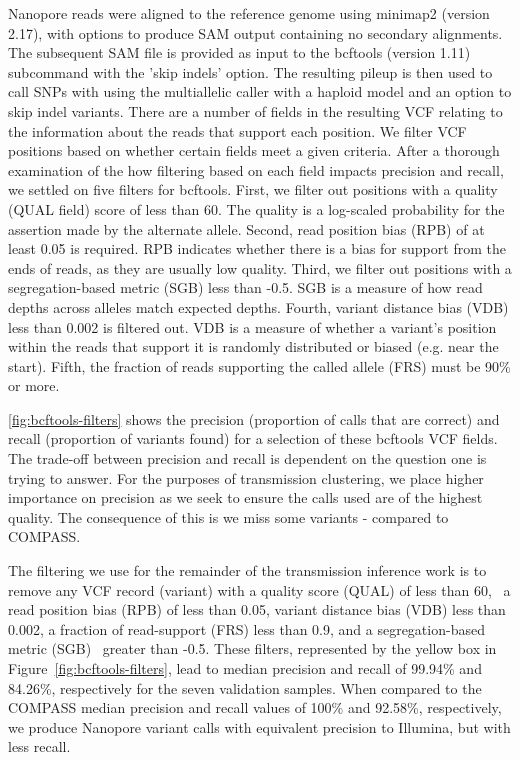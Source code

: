Nanopore reads were aligned to the \mtb{} reference genome using minimap2 (version 2.17), with options to produce SAM output containing no secondary alignments. The subsequent SAM file is provided as input to the bcftools (version 1.11) subcommand  with the 'skip indels' option. The resulting pileup is then used to call SNPs with  using the multiallelic caller with a haploid model and an option to skip indel variants.
There are a number of fields in the resulting VCF relating to the information about the reads that support each position. We filter VCF positions based on whether certain fields meet a given criteria.
After a thorough examination of the how filtering based on each field impacts precision and recall, we settled on five filters for bcftools. First, we filter out positions with a quality (QUAL field) score of less than 60. The quality is a log-scaled probability for the assertion made by the alternate allele. Second, read position bias (RPB) of at least 0.05 is required. RPB indicates whether there is a bias for support from the ends of reads, as they are usually low quality. Third, we filter out positions with a segregation-based metric (SGB) less than -0.5. SGB is a measure of how read depths across alleles match expected depths. Fourth, variant distance bias (VDB) less than 0.002 is filtered out. VDB is a measure of whether a variant's position within the reads that support it is randomly distributed or biased (e.g. near the start). Fifth, the fraction of reads supporting the called allele (FRS) must be 90\% or more.



\autoref{fig:bcftools-filters} shows the precision (proportion
of calls that are correct) and recall (proportion of variants found) for
a selection of these bcftools VCF fields. The trade-off between
precision and recall is dependent on the question one is trying to
answer. For the purposes of transmission clustering, we place higher importance on
precision as we seek to ensure the calls used are of the highest
quality. The consequence of this is we miss some variants - compared to
COMPASS.

The filtering we use for the remainder of the transmission inference
work is to remove any VCF record (variant) with a quality score (QUAL)
of less than 60,~ a read position bias (RPB) of less than 0.05, variant
distance bias (VDB) less than 0.002, a fraction of read-support (FRS)
less than 0.9, and a segregation-based metric (SGB)~ greater than -0.5.
These filters, represented by the yellow box in
Figure~{\ref{fig:bcftools-filters}}, lead to median precision and
recall of 99.94\% and 84.26\%, respectively for the seven validation
samples. When compared to the COMPASS median precision and recall values
of 100\% and 92.58\%, respectively,~ we produce Nanopore variant calls
with equivalent precision to Illumina, but with less recall.



